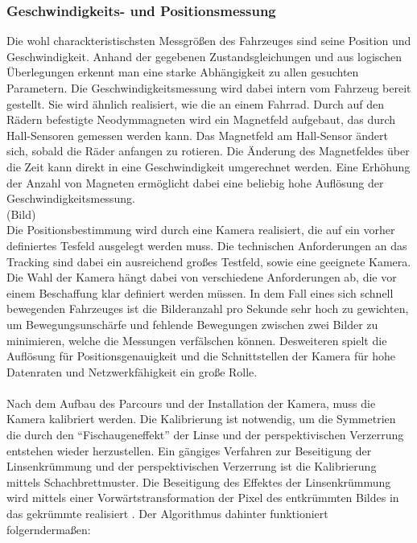 \subsubsection{Geschwindigkeits- und Positionsmessung}
Die wohl charackteristischsten Messgrößen des Fahrzeuges sind seine Position und Geschwindigkeit. Anhand der gegebenen Zustandsgleichungen und aus logischen Überlegungen erkennt man eine starke Abhängigkeit zu allen gesuchten Parametern. Die Geschwindigkeitsmessung wird dabei intern vom Fahrzeug bereit gestellt. Sie wird ähnlich realisiert, wie die an einem Fahrrad. Durch auf den Rädern befestigte Neodymmagneten wird ein Magnetfeld aufgebaut, das durch Hall-Sensoren gemessen werden kann. Das Magnetfeld am Hall-Sensor ändert sich, sobald die Räder anfangen zu rotieren. Die Änderung des Magnetfeldes über die Zeit kann direkt in eine Geschwindigkeit umgerechnet werden. Eine Erhöhung der Anzahl von Magneten ermöglicht dabei eine beliebig hohe Auflösung der Geschwindigkeitsmessung. \\

(Bild)\\ 

Die Positionsbestimmung wird durch eine Kamera realisiert, die auf ein vorher definiertes Tesfeld ausgelegt werden muss. Die technischen Anforderungen an das Tracking sind dabei ein ausreichend großes Testfeld, sowie eine geeignete Kamera. Die Wahl der Kamera hängt dabei von verschiedene Anforderungen ab, die vor einem Beschaffung klar definiert werden müssen. In dem Fall eines sich schnell bewegenden Fahrzeuges ist die Bilderanzahl pro Sekunde sehr hoch zu gewichten, um Bewegungsunschärfe und fehlende Bewegungen zwischen zwei Bilder zu minimieren, welche die Messungen verfälschen können. Desweiteren spielt die Auflösung für Positionsgenauigkeit und die Schnittstellen der Kamera für hohe Datenraten und Netzwerkfähigkeit ein große Rolle. \\ \\
Nach dem Aufbau des Parcours und der Installation der Kamera, muss die Kamera kalibriert werden. Die Kalibrierung ist notwendig, um die Symmetrien die durch den "`Fischaugeneffekt"' der Linse und der perspektivischen Verzerrung entstehen wieder herzustellen. Ein gängiges Verfahren zur Beseitigung der Linsenkrümmung und der perspektivischen Verzerrung ist die Kalibrierung mittels Schachbrettmuster. Die Beseitigung des Effektes der Linsenkrümmung wird mittels einer Vorwärtstransformation der Pixel des entkrümmten Bildes in das gekrümmte realisiert \cite{Zhang}. Der Algorithmus dahinter funktioniert folgerndermaßen:

